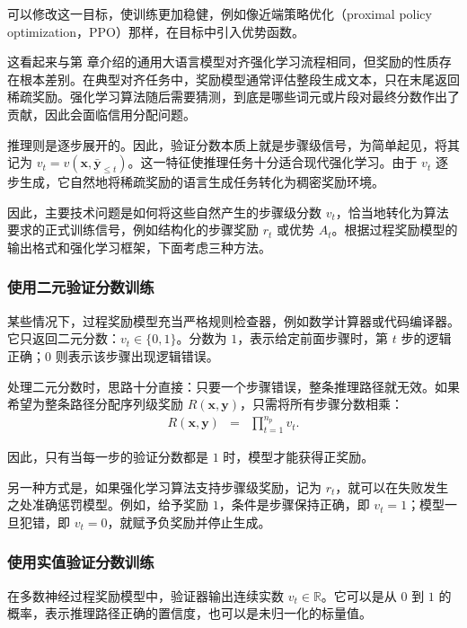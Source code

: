 \noindent 可以修改这一目标，使训练更加稳健，例如像近端策略优化（proximal policy optimization，PPO）那样，在目标中引入优势函数。

这看起来与第 \ChapterLLMTuning 章介绍的通用大语言模型对齐强化学习流程相同，但奖励的性质存在根本差别。在典型对齐任务中，奖励模型通常评估整段生成文本，只在末尾返回稀疏奖励。强化学习算法随后需要猜测，到底是哪些词元或片段对最终分数作出了贡献，因此会面临信用分配问题。

推理则是逐步展开的。因此，验证分数本质上就是步骤级信号，为简单起见，将其记为 $v_t = v(\mathbf{x}, \bar{\mathbf{y}}_{\le t})$。这一特征使推理任务十分适合现代强化学习。由于 $v_t$ 逐步生成，它自然地将稀疏奖励的语言生成任务转化为稠密奖励环境。

因此，主要技术问题是如何将这些自然产生的步骤级分数 $v_t$，恰当地转化为算法要求的正式训练信号，例如结构化的步骤奖励 $r_t$ 或优势 $A_t$。根据过程奖励模型的输出格式和强化学习框架，下面考虑三种方法。

\subsubsection{使用二元验证分数训练}

某些情况下，过程奖励模型充当严格规则检查器，例如数学计算器或代码编译器。它只返回二元分数：$v_t \in \{0, 1\}$。分数为 $1$，表示给定前面步骤时，第 $t$ 步的逻辑正确；$0$ 则表示该步骤出现逻辑错误。

处理二元分数时，思路十分直接：只要一个步骤错误，整条推理路径就无效。如果希望为整条路径分配序列级奖励 $R(\mathbf{x}, \mathbf{y})$，只需将所有步骤分数相乘：
\begin{eqnarray}
R(\mathbf{x}, \mathbf{y}) & = & \prod_{t=1}^{n_p} v_t.
\end{eqnarray}

\noindent 因此，只有当每一步的验证分数都是 $1$ 时，模型才能获得正奖励。

另一种方式是，如果强化学习算法支持步骤级奖励，记为 $r_t$，就可以在失败发生之处准确惩罚模型。例如，给予奖励 $1$，条件是步骤保持正确，即 $v_t = 1$；模型一旦犯错，即 $v_t = 0$，就赋予负奖励并停止生成。


\subsubsection{使用实值验证分数训练}

在多数神经过程奖励模型中，验证器输出连续实数 $v_t \in \mathbb{R}$。它可以是从 $0$ 到 $1$ 的概率，表示推理路径正确的置信度，也可以是未归一化的标量值。

